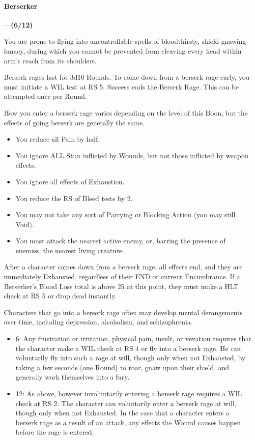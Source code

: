 \documentclass[oneside,11pt,english]{book}
\begin{document}
\paragraph{\label{boon:Berserker}Berserker}---\quad \textbf{(6/12)}\par
You are prone to flying into uncontrollable spells of bloodthirsty, shield-gnawing lunacy, during which 
you cannot be prevented from cleaving every head within arm's reach from its shoulders. 


Berserk rages last for 3d10 Rounds. To come down from a berserk rage early, you must initiate a WIL 
test at RS 5. Success ends the Berserk Rage. This can be attempted once per Round. 


How you enter a berserk rage varies depending on the level of this Boon, but the effects of going berserk 
are generally the same. 
\begin{itemize}
\item You reduce all Pain by half. 
\item You ignore ALL Stun inflicted by Wounds, but not those inflicted by weapon effects. 
\item You ignore all effects of Exhaustion. 
\item You reduce the RS of Bleed tests by 2. 
\item You may not take any sort of Parrying or Blocking Action (you may still Void). 
\item You must attack the nearest active enemy, or, barring the presence of enemies, the nearest living 
creature. 
\end{itemize}
After a character comes down from a berserk rage, all effects end, and they are immediately Exhausted, 
regardless of their END or current Encumbrance. If a Berserker's Blood Loss total is above 25 at this 
point, they must make a HLT check at RS 5 or drop dead instantly. 


Characters that go into a berserk rage often may develop mental derangements over time, including 
depression, alcoholism, and schizophrenia. 
\begin{itemize}
\item 6: Any frustration or irritation, physical pain, insult, or vexation requires that the character make a WIL check at RS 4 or fly into a berserk rage. He can voluntarily fly into such a rage at will, though only when not Exhausted, by taking a few seconds (one Round) to roar, gnaw upon their shield, and generally work 
themselves into a fury.
\item 12: As above, however involuntarily entering a berserk rage requires a WIL check at RS 2. The character can voluntarily enter a berserk rage at will, though only when not Exhausted. In the case that a character enters a berserk rage as a result of an attack, any effects the Wound causes happen before the rage is entered.
\end{itemize}
\end{document}
